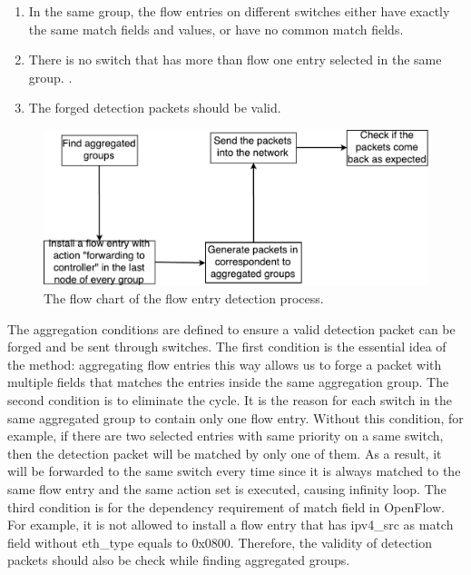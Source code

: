 \begin{enumerate}
\item
In the same group, the flow entries on different switches either have exactly the same match fields and values, or have no common match fields.
\item
There is no switch that has more than flow one entry selected in the same group. \sout{}.
\item
The forged detection packets should be valid. 
\end{enumerate}

\begin{figure}[H]
\begin{center} 
\includegraphics[width=1\textwidth]{figures/flow_entry_detection_flowchart.pdf}
\end{center}
\caption{The flow chart of the flow entry detection process.}
\label{flow_entry_detection_flowchart}
\end{figure}

The aggregation conditions are defined to ensure a valid detection packet can be forged and be sent through switches. The first condition is the essential idea of the method: aggregating flow entries this way allows us to forge a packet with multiple fields that matches the entries inside the same aggregation group. The second condition is to eliminate the cycle. It is the reason for each switch in the same aggregated group to contain only one flow entry. Without this condition, for example, if there are two selected entries with same priority on a same switch, then the detection packet will be matched by only one of them. As a result, it will be forwarded to the same switch every time since it is always matched to the same flow entry and the same action set is executed, causing infinity loop. The third condition is for the dependency requirement of match field in OpenFlow. For example, it is not allowed to install a flow entry that has ipv4\_src as match field without eth\_type equals to 0x0800. Therefore, the validity of detection packets should also be check while finding aggregated groups.

